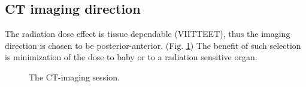 \documentclass[fleqn,10pt]{SelfArx} %
\begin{document}
\subsection{CT imaging direction}


The radiation dose effect is tissue dependable (VIITTEET), thus the imaging direction is chosen to be posterior-anterior. (Fig. \ref{fig:KuvausSuunta}) The benefit of such selection is minimization of the dose to baby or to a radiation sensitive organ.


\begin{figure}[ht]\centering
\caption{The CT-imaging session.}
\label{fig:KuvausSuunta}
\end{figure}


\end{document}

